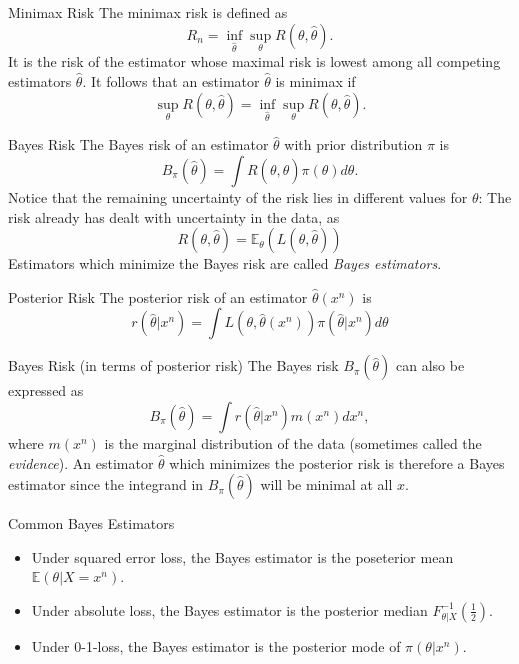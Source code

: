 \documentclass[avery5371,grid]{flashcards}
\begin{document}
\begin{flashcard}[Definition]{Minimax Risk}
 The minimax risk is defined as
 \[
 R_n = \inf_{\hat \theta} \sup_\theta R\left( \theta, \hat \theta \right).
 \]
It is the risk of the estimator whose maximal risk is lowest among all competing estimators
$\hat \theta$. It follows that an estimator $\hat \theta$ is minimax if 
\[
\sup_\theta R\left( \theta, \hat \theta \right) = \inf_{\hat \theta} \sup_\theta R\left( \theta, \hat \theta \right).
\]
\end{flashcard}

\begin{flashcard}[Definition]{Bayes Risk}
\scriptsize
The Bayes risk of an estimator $\hat \theta$ with prior distribution $\pi$ is
\[
B_\pi (\hat\theta) = \int R\left( \theta, \hat \theta \right) \pi\left(\theta \right) d\theta. 
\] 
Notice that the remaining uncertainty of the risk lies in different values for $\theta$: The risk already has dealt with 
uncertainty in the data, as 
\[
R\left( \theta, \hat \theta \right) = \mathbb{E}_\theta {\left( L(\theta, \hat \theta)\right)}
\]
Estimators which minimize the Bayes risk are called \textit{Bayes estimators}.
\end{flashcard}

\begin{flashcard}[Definition]{Posterior Risk}
 The posterior risk of an estimator $\hat \theta(x^n)$ is 
 \[
 r(\hat \theta | x^n) = \int L(\theta, \hat \theta(x^n)) \pi(\hat \theta | x^n) d\theta
 \]
\end{flashcard}

\begin{flashcard}[Theorem]{Bayes Risk (in terms of posterior risk)}
 The Bayes risk $B_\pi (\hat \theta)$ can also be expressed as
 \[
 B_\pi(\hat \theta) = \int  r(\hat \theta | x^n) m(x^n) dx^n,
 \]
 where $m(x^n)$ is the marginal distribution of the data (sometimes called the \textit{evidence}). An estimator
 $\hat \theta$ which minimizes the posterior risk is therefore a Bayes estimator 
 since the integrand in  $B_\pi(\hat \theta)$ will be minimal at all $x$.  
\end{flashcard}

\begin{flashcard}[Theorem]{Common Bayes Estimators}
\begin{itemize}
 \item Under squared error loss, the Bayes estimator is the poseterior mean 
 $\mathbb{E}(\theta|X=x^n)$.
 \item Under absolute loss, the Bayes estimator is the posterior median 
 $F_{\theta|X}^{-1}(\frac{1}{2})$. 
 \item Under 0-1-loss, the Bayes estimator is the posterior mode of $\pi(\theta|x^n)$.
\end{itemize}
\end{flashcard}
\end{document}
